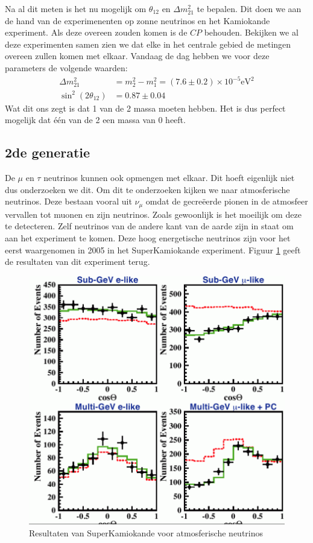\documentclass[../main.tex]{subfiles}
\begin{document}
Na al dit meten is het nu mogelijk om $\theta_{12}$ en $\Delta m_{21}^{2}$ te bepalen. Dit doen we aan de hand van de experimenenten op zonne neutrinos en het Kamiokande experiment. Als deze overeen zouden komen is de $CP$ behouden. Bekijken we al deze experimenten samen zien we dat elke in het centrale gebied de metingen overeen zullen komen met elkaar. Vandaag de dag hebben we voor deze parameters de volgende waarden:
\begin{equation}
    \begin{aligned}
        \label{eq:neutrino_osc_waarden}
        \Delta m_{21}^{2}&=m_{2}^{2}-m_{1}^{2}=(7.6 \pm 0.2) \times 10^{-5} \mathrm{eV}^{2}\\
        \sin ^{2}\left(2 \theta_{12}\right)&=0.87 \pm 0.04
    \end{aligned}
\end{equation}
Wat dit ons zegt is dat 1 van de 2 massa moeten hebben. Het is dus perfect mogelijk dat één van de 2 een massa van 0 heeft.

\subsection{2de generatie}%
\label{sub:2de_generatie}

De $\mu$ en $\tau$ neutrinos kunnen ook opmengen met elkaar. Dit hoeft eigenlijk niet dus onderzoeken we dit. Om dit te onderzoeken kijken we naar atmosferische neutrinos. Deze bestaan vooral uit $\nu_\mu$ omdat de gecreëerde pionen in de atmosfeer vervallen tot muonen en zijn neutrinos. Zoals gewoonlijk is het moeilijk om deze te detecteren. Zelf neutrinos van de andere kant van de aarde zijn in staat om aan het experiment te komen. Deze hoog energetische neutrinos zijn voor het eerst waargenomen in 2005 in het SuperKamiokande experiment. Figuur \ref{fig:neutrinos/superkamiokande_experiment} geeft de resultaten van dit experiment terug.

\begin{figure}[h]
    \centering
    \includegraphics[width=0.5\linewidth]{neutrinos/superkamiokande_experiment.png}
    \caption{Resultaten van SuperKamiokande voor atmosferische neutrinos}%
    \label{fig:neutrinos/superkamiokande_experiment}
\end{figure}
\end{document}
